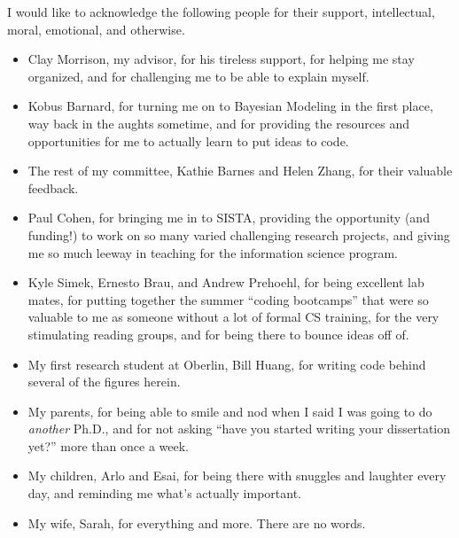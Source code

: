 


I would like to acknowledge the following people for their support,
intellectual, moral, emotional, and otherwise.
\begin{itemize}
\item Clay Morrison, my advisor, for his tireless support, for helping
  me stay organized, and for challenging me to be able to explain myself.

\item Kobus Barnard, for turning me on to Bayesian Modeling in the
  first place, way back in the aughts sometime, and for providing the
  resources and opportunities for me to actually learn to put ideas to
  code.

\item The rest of my committee, Kathie Barnes and Helen Zhang, for
  their valuable feedback.

\item Paul Cohen, for bringing me in to SISTA, providing the
  opportunity (and funding!) to work on so many varied challenging 
  research projects, and giving me so much leeway in teaching for the
  information science program.

\item Kyle Simek, Ernesto Brau, and Andrew Prehoehl, for being excellent lab mates,
  for putting together the summer ``coding bootcamps'' that were so
  valuable to me as someone without a lot of formal CS training, for
  the very stimulating reading groups, and for being there to bounce
  ideas off of.

\item My first research student at Oberlin, Bill Huang, for writing code behind
  several of the figures herein.

\item My parents, for being able to smile and nod when I said I was
  going to do {\em another} Ph.D., and for not asking ``have you started
  writing your dissertation yet?'' more than once a week.

\item My children, Arlo and Esai, for being there with snuggles and
  laughter every day, and reminding me what's actually important.

\item My wife, Sarah, for everything and more.  There are no words.
\end{itemize}




